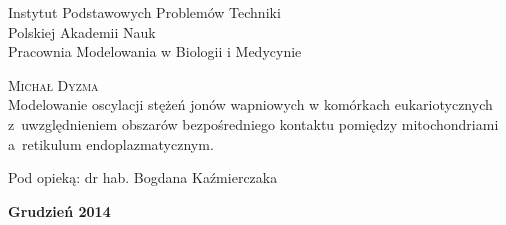 \thispagestyle{empty}
\begin{center}
\noindent \Large{Instytut Podstawowych Problemów Techniki\\Polskiej Akademii Nauk\\
    Pracownia Modelowania w Biologii i Medycynie} \\
\vspace*{3cm}

\noindent \LARGE \textsc{Michał Dyzma} \\
\vspace*{0.8cm}
\noindent \Huge Modelowanie oscylacji stężeń jonów wapniowych w komórkach eukariotycznych z~uwzględnieniem obszarów bezpośredniego kontaktu pomiędzy mitochondriami a~retikulum endoplazmatycznym.\\
\vspace*{1.9cm}
\begin{flushright}
\noindent \Large Pod opieką: dr hab. Bogdana Kaźmierczaka \\
\end{flushright}
\end{center}
\vfill
\begin{center}
\Large\textbf{{Grudzień 2014}}
\end{center}
\newpage